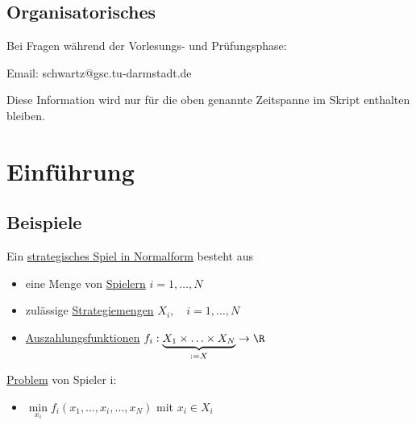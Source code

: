 
\section*{Organisatorisches}%
\label{sec:Organisatorisches}

Bei Fragen während der Vorlesungs- und Prüfungsphase:

Email: schwartz@gsc.tu-darmstadt.de

Diese Information wird nur für die oben genannte Zeitspanne im Skript enthalten bleiben.

\chapter{Einführung}

\section{Beispiele}%
\label{sec:Beispiele}

\begin{definition}
	Ein \underline{strategisches Spiel in Normalform} besteht aus 
	\begin{itemize}
		\item eine Menge von \underline{Spielern}  $i=1,\ldots, N$
		\item zulässige \underline{Strategiemengen} $X_i, \quad i=1,\ldots, N$
		\item \underline{Auszahlungsfunktionen}  $f_i : \underbrace{X_1 \times \ldots \times X_N}_{:=X} \to \R$
	\end{itemize}
	\underline{Problem} von Spieler i:
	\begin{itemize}
		\item $\min\limits_{x_i} f_i(x_1, \ldots, x_i, \ldots, x_N)$ mit $x_i \in X_i$
	\end{itemize}
\end{definition}

